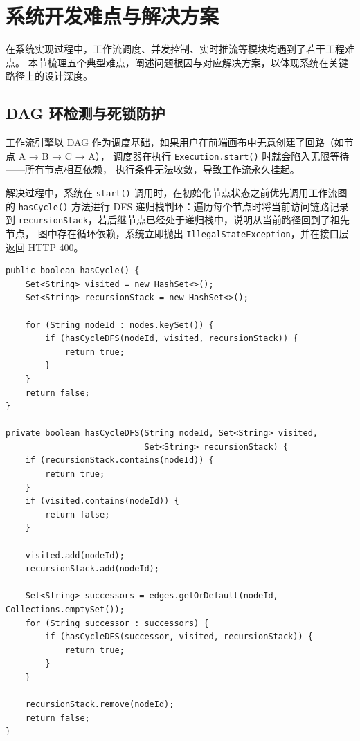 \section{系统开发难点与解决方案}

在系统实现过程中，工作流调度、并发控制、实时推流等模块均遇到了若干工程难点。
本节梳理五个典型难点，阐述问题根因与对应解决方案，以体现系统在关键路径上的设计深度。

\subsection{DAG 环检测与死锁防护}


工作流引擎以 DAG 作为调度基础，如果用户在前端画布中无意创建了回路（如节点 A → B → C → A），
调度器在执行 \texttt{Execution.start()} 时就会陷入无限等待——所有节点相互依赖，
执行条件无法收敛，导致工作流永久挂起。


解决过程中，系统在 \texttt{start()} 调用时，在初始化节点状态之前优先调用工作流图的
\texttt{hasCycle()} 方法进行 DFS 递归栈判环：遍历每个节点时将当前访问链路记录到
\texttt{recursionStack}，若后继节点已经处于递归栈中，说明从当前路径回到了祖先节点，
图中存在循环依赖，系统立即抛出 \texttt{IllegalStateException}，并在接口层返回 HTTP 400。

\begin{lstlisting}[style=java, caption={WorkflowGraph.hasCycle() DFS 递归栈环检测}]
public boolean hasCycle() {
    Set<String> visited = new HashSet<>();
    Set<String> recursionStack = new HashSet<>();

    for (String nodeId : nodes.keySet()) {
        if (hasCycleDFS(nodeId, visited, recursionStack)) {
            return true;
        }
    }
    return false;
}

private boolean hasCycleDFS(String nodeId, Set<String> visited,
                            Set<String> recursionStack) {
    if (recursionStack.contains(nodeId)) {
        return true;
    }
    if (visited.contains(nodeId)) {
        return false;
    }

    visited.add(nodeId);
    recursionStack.add(nodeId);

    Set<String> successors = edges.getOrDefault(nodeId, Collections.emptySet());
    for (String successor : successors) {
        if (hasCycleDFS(successor, visited, recursionStack)) {
            return true;
        }
    }

    recursionStack.remove(nodeId);
    return false;
}
\end{lstlisting}

